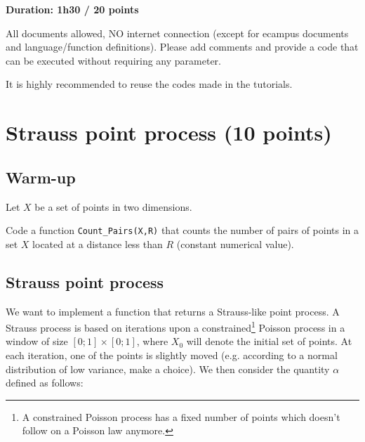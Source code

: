 


\noindent
{\bf Duration: 1h30 / 20 points}


\begin{note}
All documents allowed, NO internet connection (except for ecampus documents and language/function definitions). Please add comments and provide a code that can be executed without requiring any parameter.

It is highly recommended to reuse the codes made in the tutorials.
\end{note}

\section{Strauss point process (10 points)}

\subsection{Warm-up}


Let $X$ be a set of points in two dimensions.

\begin{qbox}
Code a function \texttt{Count\_Pairs(X,R)} that counts the number of pairs of points in a set $X$ located at a distance less than $R$ (constant numerical value).
\end{qbox}

\subsection{Strauss point process}

We want to implement a function that returns a Strauss-like point process. A Strauss process is based on iterations upon a constrained\footnote{A constrained Poisson process has a fixed number of points which doesn't follow on a Poisson law anymore.} Poisson process in a window of size $[0;1]\times[0;1]$, where $X_0$ will denote the initial set of points. At each iteration, one of the points is slightly moved (e.g. according to a normal distribution of low variance, make a choice). We then consider the quantity $\alpha$ defined as follows:

